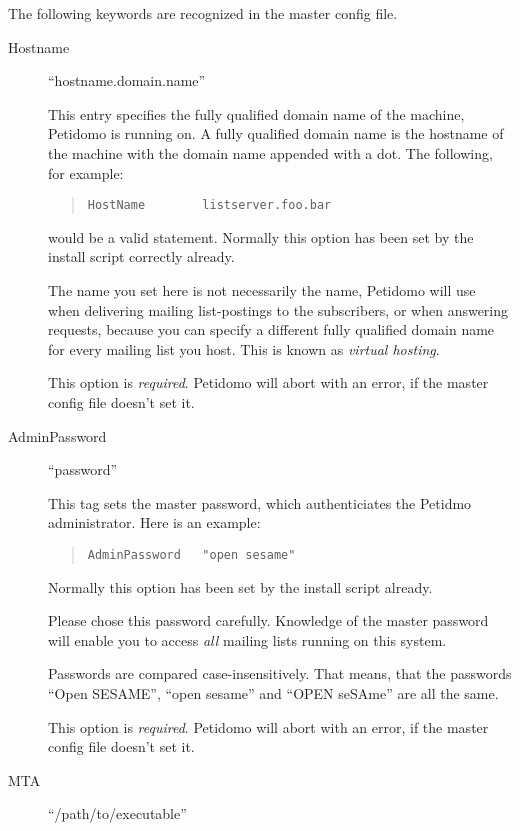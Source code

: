 \documentclass[a4paper,10pt]{scrreprt}
\newcommand{\Def}[1]{{\sl #1}}
\begin{document}
The following keywords are recognized in the master config file.

\begin{description}

\item[Hostname] \hfill ``hostname.domain.name''

This entry specifies the fully qualified domain name of the machine,
Petidomo is running on. A fully qualified domain name is the
hostname of the machine with the domain name appended with a dot. The
following, for example:
\begin{quote}
\begin{verbatim}
HostName        listserver.foo.bar
\end{verbatim}
\end{quote}
would be a valid statement. Normally this option has been set by the
install script correctly already.

The name you set here is not necessarily the name, Petidomo will use
when delivering mailing list-postings to the subscribers, or when
answering requests, because you can specify a different fully
qualified domain name for every mailing list you host. This is known
as \Def{virtual hosting}.

This option is \emph{required}. Petidomo will abort with an error,
if the master config file doesn't set it.

\item[AdminPassword] \hfill ``password''

This tag sets the master password, which authenticiates the Petidmo
administrator. Here is an example:
\begin{quote}
\begin{verbatim}
AdminPassword   "open sesame"
\end{verbatim}
\end{quote}
Normally this option has been set by the install script already.

Please chose this password carefully. Knowledge of the master password
will enable you to access \emph{all} mailing lists running on this
system.

Passwords are compared case-insensitively. That means, that the
passwords ``Open SESAME'', ``open sesame'' and ``OPEN seSAme'' are all
the same.

This option is \emph{required}. Petidomo will abort with an error,
if the master config file doesn't set it.


\item[MTA] \hfill ``/path/to/executable''


\end{description}
\end{document}
